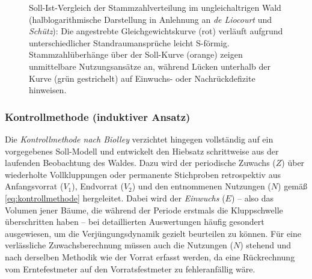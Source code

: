 \documentclass[twocolumn, paper=a4, fontsize=10pt]{scrartcl}
\begin{document}
\begin{figure}[!htbp]
  \caption{Soll-Ist-Vergleich der Stammzahlverteilung im ungleichaltrigen Wald (halblogarithmische Darstellung in Anlehnung an \emph{de Liocourt} und \emph{Schütz}): Die angestrebte Gleichgewichtskurve (rot) verläuft aufgrund unterschiedlicher Standraumansprüche leicht S-förmig. Stammzahlüberhänge über der Soll-Kurve (orange) zeigen unmittelbare Nutzungsansätze an, während Lücken unterhalb der Kurve (grün gestrichelt) auf Einwuchs- oder Nachrückdefizite hinweisen.}
  \label{fig:plentergleichgewicht}
\end{figure}

\subsubsection{Kontrollmethode (induktiver Ansatz)}

Die \emph{Kontrollmethode nach Biolley} verzichtet hingegen vollständig auf ein vorgegebenes Soll-Modell und entwickelt den Hiebsatz schrittweise aus der laufenden Beobachtung des Waldes. Dazu wird der periodische Zuwachs ($Z$) über wiederholte Vollkluppungen oder permanente Stichproben retrospektiv aus Anfangsvorrat ($V_1$), Endvorrat ($V_2$) und den entnommenen Nutzungen ($N$) gemäß \cref{eq:kontrollmethode} hergeleitet. Dabei wird der \emph{Einwuchs} ($E$) -- also das Volumen jener Bäume, die während der Periode erstmals die Kluppschwelle überschritten haben -- bei detaillierten Auswertungen häufig gesondert ausgewiesen, um die Verjüngungsdynamik gezielt beurteilen zu können. Für eine verlässliche Zuwachsberechnung müssen auch die Nutzungen ($N$) stehend und nach derselben Methodik wie der Vorrat erfasst werden, da eine Rückrechnung vom Erntefestmeter auf den Vorratsfestmeter zu fehleranfällig wäre.
\end{document}

